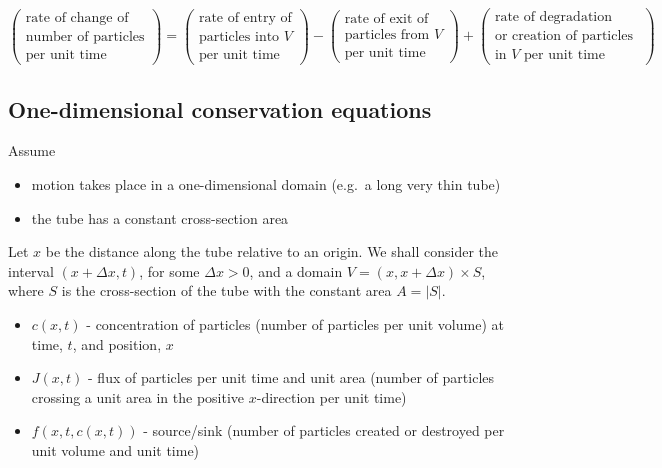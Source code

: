\documentclass[
  letterpaper,
  DIV=11,
  numbers=noendperiod]{scrreprt}
\providecommand{\tightlist}{%
  \setlength{\itemsep}{0pt}\setlength{\parskip}{0pt}}\usepackage{longtable,booktabs,array}
\theoremstyle{plain}
\theoremstyle{definition}
\theoremstyle{plain}
\theoremstyle{remark}
\begin{document}
\[
\begin{pmatrix}
\text{rate of change of}\\
\text{number of particles} \\
\text{per unit time } 
\end{pmatrix}
= \begin{pmatrix}
\text{rate of entry of}\\
\text{particles into $V$}\\
\text{per unit time}
\end{pmatrix}
- \begin{pmatrix}
\text{rate of exit of }\\
\text{particles from $V$}\\
\text{per unit time}
\end{pmatrix}
+ 
 \begin{pmatrix}
 \text{rate of degradation}\\
 \text{or creation of particles }\\
  \text{in $V$ per unit time} 
\end{pmatrix}
\]

\hypertarget{one-dimensional-conservation-equations}{%
\subsection{One-dimensional conservation
equations}\label{one-dimensional-conservation-equations}}

Assume

\begin{itemize}
\tightlist
\item
  motion takes place in a one-dimensional domain (e.g.~a long very thin
  tube)
\item
  the tube has a constant cross-section area
\end{itemize}

Let \(x\) be the distance along the tube relative to an origin. We shall
consider the interval \((x+\Delta x, t)\), for some \(\Delta x >0\), and
a domain \(V= (x, x+ \Delta x) \times S\), where \(S\) is the
cross-section of the tube with the constant area \(A=|S|\).

\begin{itemize}
\item
  \(c(x,t)\) - concentration of particles (number of particles per unit
  volume) at time, \(t\), and position, \(x\)
\item
  \(J(x,t)\) - flux of particles per unit time and unit area (number of
  particles crossing a unit area in the positive \(x\)-direction per
  unit time)
\item
  \(f(x,t ,c(x,t))\) - source/sink (number of particles created or
  destroyed per unit volume and unit time)
\end{itemize}
\end{document}
